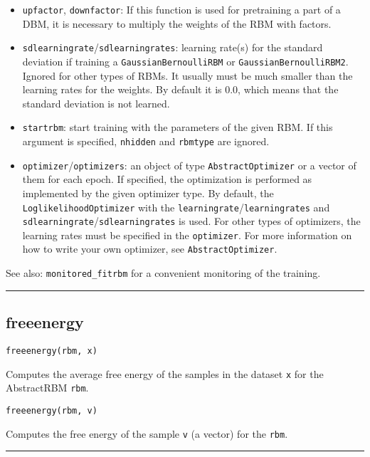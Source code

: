 \begin{itemize}
\item \texttt{upfactor}, \texttt{downfactor}: If this function is used for pretraining a part of  a DBM, it is necessary to multiply the weights of the RBM with factors.


\item \texttt{sdlearningrate}/\texttt{sdlearningrates}: learning rate(s) for the  standard deviation if training a \texttt{GaussianBernoulliRBM} or  \texttt{GaussianBernoulliRBM2}. Ignored for other types of RBMs.  It usually must be much smaller than the learning rates for  the weights. By default it is 0.0, which means that the standard deviation  is not learned.


\item \texttt{startrbm}: start training with the parameters of the given RBM.  If this argument is specified, \texttt{nhidden} and \texttt{rbmtype} are ignored.


\item \texttt{optimizer}/\texttt{optimizers}: an object of type \texttt{AbstractOptimizer} or a vector of  them for each epoch. If specified, the optimization is performed as implemented  by the given optimizer type. By default, the \texttt{LoglikelihoodOptimizer}  with the \texttt{learningrate}/\texttt{learningrates} and \texttt{sdlearningrate}/\texttt{sdlearningrates}  is used. For other types of optimizers, the learning rates must be specified  in the \texttt{optimizer}. For more information on how to write your own optimizer,  see \texttt{AbstractOptimizer}.

\end{itemize}
See also: \texttt{monitored\_fitrbm} for a convenient monitoring of the training.

\noindent\rule{\textwidth}{1pt}
\subsection*{freeenergy}
\begin{verbatim}
freeenergy(rbm, x)
\end{verbatim}
Computes the average free energy of the samples in the dataset \texttt{x} for the AbstractRBM \texttt{rbm}.

\begin{verbatim}
freeenergy(rbm, v)
\end{verbatim}
Computes the free energy of the sample \texttt{v} (a vector) for the \texttt{rbm}.

\noindent\rule{\textwidth}{1pt}
